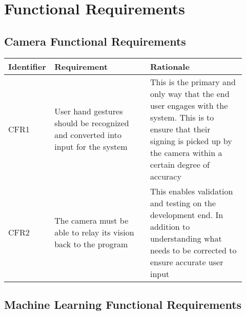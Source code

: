\documentclass[12pt]{article}
\begin{document}
\section{Functional Requirements}
\subsection{Camera Functional Requirements}

\renewcommand{\arraystretch}{1.2}
\noindent \begin{tabularx}{\textwidth}{p{0.12\linewidth}|p{0.4\linewidth}|p{0.4\linewidth}}
\toprule
\textbf{Identifier} & \textbf{Requirement} & \textbf{Rationale}\\
\midrule
CFR1 
& User hand gestures should be recognized and converted into input for the system 
& This is the primary and only way that the end user engages with the system. This is to ensure that 
their signing is picked up by the camera within a certain degree of accuracy\\
\hline
CFR2
& The camera must be able to relay its vision back to the program
& This enables validation and testing on the development end. In addition to understanding what needs 
to be corrected to ensure accurate user input\\
\bottomrule
\end{tabularx}

\subsection{Machine Learning Functional Requirements}
\end{document}
